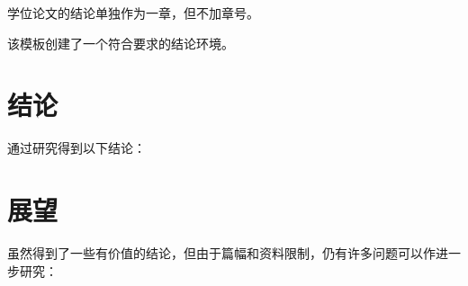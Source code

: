
\begin{summary}[结论与展望]  %
    学位论文的结论单独作为一章，但不加章号。
    
    该模板创建了一个符合要求的结论环境。
    \section*{结论}
    通过研究得到以下结论：
    \section*{展望}
    虽然得到了一些有价值的结论，但由于篇幅和资料限制，仍有许多问题可以作进一步研究：
\end{summary}